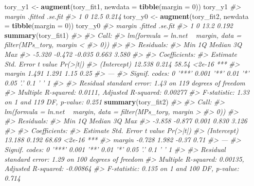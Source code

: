 \documentclass[]{book}
\newenvironment{Shaded}{\begin{snugshade}}{\end{snugshade}}
\newcommand{\KeywordTok}[1]{\textcolor[rgb]{0.13,0.29,0.53}{\textbf{#1}}}
\newcommand{\DataTypeTok}[1]{\textcolor[rgb]{0.13,0.29,0.53}{#1}}
\newcommand{\DecValTok}[1]{\textcolor[rgb]{0.00,0.00,0.81}{#1}}
\newcommand{\StringTok}[1]{\textcolor[rgb]{0.31,0.60,0.02}{#1}}
\newcommand{\CommentTok}[1]{\textcolor[rgb]{0.56,0.35,0.01}{\textit{#1}}}
\newcommand{\NormalTok}[1]{#1}
\theoremstyle{definition}
\theoremstyle{definition}
\theoremstyle{definition}
\theoremstyle{remark}
\begin{document}
\begin{Shaded}
\begin{Highlighting}[]
\NormalTok{tory_y1 <-}\StringTok{ }\KeywordTok{augment}\NormalTok{(tory_fit1, }\DataTypeTok{newdata =} \KeywordTok{tibble}\NormalTok{(}\DataTypeTok{margin =} \DecValTok{0}\NormalTok{))}
\NormalTok{tory_y1}
\CommentTok{#>   margin .fitted .se.fit}
\CommentTok{#> 1      0    12.5   0.214}
\NormalTok{tory_y0 <-}\StringTok{ }\KeywordTok{augment}\NormalTok{(tory_fit2, }\DataTypeTok{newdata =} \KeywordTok{tibble}\NormalTok{(}\DataTypeTok{margin =} \DecValTok{0}\NormalTok{))}
\NormalTok{tory_y0}
\CommentTok{#>   margin .fitted .se.fit}
\CommentTok{#> 1      0    13.2   0.192}
\KeywordTok{summary}\NormalTok{(tory_fit1)}
\CommentTok{#> }
\CommentTok{#> Call:}
\CommentTok{#> lm(formula = ln.net ~ margin, data = filter(MPs_tory, margin < }
\CommentTok{#>     0))}
\CommentTok{#> }
\CommentTok{#> Residuals:}
\CommentTok{#>    Min     1Q Median     3Q    Max }
\CommentTok{#> -5.320 -0.472 -0.035  0.663  3.580 }
\CommentTok{#> }
\CommentTok{#> Coefficients:}
\CommentTok{#>             Estimate Std. Error t value Pr(>|t|)    }
\CommentTok{#> (Intercept)   12.538      0.214   58.54   <2e-16 ***}
\CommentTok{#> margin         1.491      1.291    1.15     0.25    }
\CommentTok{#> ---}
\CommentTok{#> Signif. codes:  0 '***' 0.001 '**' 0.01 '*' 0.05 '.' 0.1 ' ' 1}
\CommentTok{#> }
\CommentTok{#> Residual standard error: 1.43 on 119 degrees of freedom}
\CommentTok{#> Multiple R-squared:  0.0111, Adjusted R-squared:  0.00277 }
\CommentTok{#> F-statistic: 1.33 on 1 and 119 DF,  p-value: 0.251}
\KeywordTok{summary}\NormalTok{(tory_fit2)}
\CommentTok{#> }
\CommentTok{#> Call:}
\CommentTok{#> lm(formula = ln.net ~ margin, data = filter(MPs_tory, margin > }
\CommentTok{#>     0))}
\CommentTok{#> }
\CommentTok{#> Residuals:}
\CommentTok{#>    Min     1Q Median     3Q    Max }
\CommentTok{#> -3.858 -0.877  0.001  0.830  3.126 }
\CommentTok{#> }
\CommentTok{#> Coefficients:}
\CommentTok{#>             Estimate Std. Error t value Pr(>|t|)    }
\CommentTok{#> (Intercept)   13.188      0.192   68.69   <2e-16 ***}
\CommentTok{#> margin        -0.728      1.982   -0.37     0.71    }
\CommentTok{#> ---}
\CommentTok{#> Signif. codes:  0 '***' 0.001 '**' 0.01 '*' 0.05 '.' 0.1 ' ' 1}
\CommentTok{#> }
\CommentTok{#> Residual standard error: 1.29 on 100 degrees of freedom}
\CommentTok{#> Multiple R-squared:  0.00135,    Adjusted R-squared:  -0.00864 }
\CommentTok{#> F-statistic: 0.135 on 1 and 100 DF,  p-value: 0.714}
\end{Highlighting}
\end{Shaded}
\end{document}
